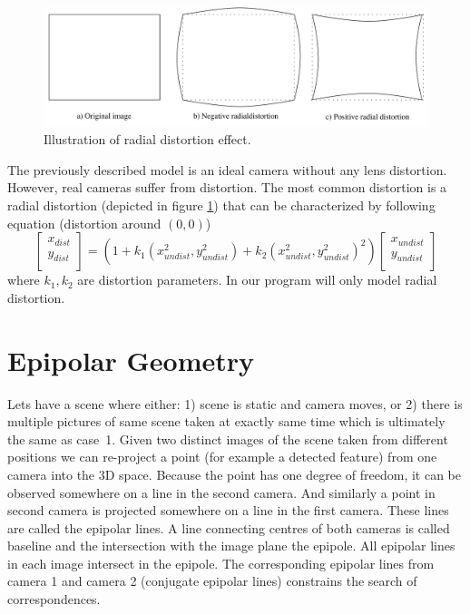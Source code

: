 \begin{figure}[!htbp]
	\begin{center}
		\includegraphics[keepaspectratio,width=\textwidth]{fig/distortion.pdf}
	\end{center}
	\caption{Illustration of radial distortion effect.}
	\label{fig:dist}
\end{figure}

The previously described model is an ideal camera without any lens distortion. However, real cameras suffer from distortion. The most common distortion is a radial distortion (depicted in figure \ref{fig:dist}) that can be characterized by following equation (distortion around $(0,0)$)
\begin{equation}
	\begin{bmatrix}
		x_{dist} \\
		y_{dist} \\
	\end{bmatrix}
	= (1 + k_1(x^2_{undist}, y^2_{undist}) + k_2(x^2_{undist}, y^2_{undist})^2)
	\begin{bmatrix}
		x_{undist} \\
		y_{undist} \\
	\end{bmatrix}
	\label{distortion}
\end{equation}
where $k_1,k_2$ are distortion parameters. In our program will only model radial distortion.

\section{Epipolar Geometry}
Lets have a scene where either: 1) scene is static and camera moves, or 2) there is multiple pictures of same scene taken at exactly same time which is ultimately the same as case~1. Given two distinct images of the scene taken from different positions we can re-project a point (for example a detected feature) from one camera into the 3D space. Because the point has one degree of freedom, it can be observed somewhere on a line in the second camera. And similarly a point in second camera is projected somewhere on a line in the first camera. These lines are called the epipolar lines. A line connecting centres of both cameras is called baseline and the intersection with the image plane the epipole. All epipolar lines in each image intersect in the epipole. The corresponding epipolar lines from camera 1 and camera 2 (conjugate epipolar lines) constrains the search of correspondences. \cite{www:multi-view-geometry-presentation, www:extrinsic-camera, www:visual-3D-modeling, book:multiple_view_geometry}

